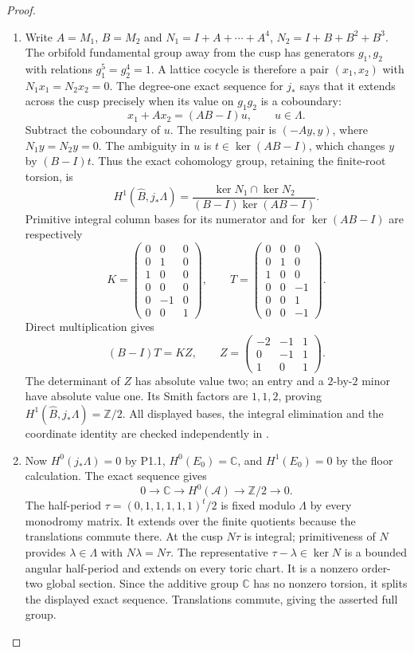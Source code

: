 \begin{proof}
\begin{enumerate}[label=\arabic*.]
\item Write $A=M_1$, $B=M_2$ and
$N_1=I+A+\cdots+A^4$, $N_2=I+B+B^2+B^3$.
The orbifold fundamental group away from the cusp has generators
$g_1,g_2$ with relations $g_1^5=g_2^4=1$.  A lattice cocycle is
therefore a pair $(x_1,x_2)$ with $N_1x_1=N_2x_2=0$.
The degree-one exact sequence for $j_*$ says that it extends across
the cusp precisely when its value on $g_1g_2$ is a coboundary:
\[
x_1+Ax_2=(AB-I)u,\qquad u\in\Lambda.
\]
Subtract the coboundary of $u$.  The resulting pair is $(-Ay,y)$,
where $N_1y=N_2y=0$.  The ambiguity in $u$ is
$t\in\ker(AB-I)$, which changes $y$ by $(B-I)t$.
Thus the exact cohomology group, retaining the finite-root torsion, is
\[
H^1(\widehat B,j_*\Lambda)=
\frac{\ker N_1\cap\ker N_2}{(B-I)\ker(AB-I)}.
\]
Primitive integral column bases for its numerator and for
$\ker(AB-I)$ are respectively
\[
K=\begin{pmatrix}
0&0&0\\0&1&0\\1&0&0\\0&0&0\\0&-1&0\\0&0&1
\end{pmatrix},\qquad
T=\begin{pmatrix}
0&0&0\\0&1&0\\1&0&0\\0&0&-1\\0&0&1\\0&0&-1
\end{pmatrix}.
\]
Direct multiplication gives
\[
(B-I)T=KZ,\qquad
Z=\begin{pmatrix}-2&-1&1\\0&-1&1\\1&0&1\end{pmatrix}.
\]
The determinant of $Z$ has absolute value two; an entry and a
$2$-by-$2$ minor have absolute value one.  Its Smith factors are
$1,1,2$, proving $H^1(\widehat B,j_*\Lambda)=\mathbb Z/2$.
All displayed bases, the integral elimination and the coordinate
identity are checked independently in
.

\item Now $H^0(j_*\Lambda)=0$ by P1.1,
$H^0(E_0)=\mathbb C$, and $H^1(E_0)=0$ by the floor
calculation. The exact sequence gives
\[
0\to\mathbb C\to H^0(\mathcal A)\to\mathbb Z/2\to0.
\]
The half-period
$\tau=(0,1,1,1,1,1)^t/2$ is fixed modulo $\Lambda$
by every monodromy matrix. It extends over the finite
quotients because the translations commute there.
At the cusp $N\tau$ is integral; primitiveness of $N$
provides $\lambda\in\Lambda$ with $N\lambda=N\tau$.
The representative $\tau-\lambda\in\ker N$ is a bounded
angular half-period and extends on every toric chart.
It is a nonzero order-two global section. Since the
additive group $\mathbb C$ has no nonzero torsion, it
splits the displayed exact sequence. Translations
commute, giving the asserted full group.


\end{enumerate}
\end{proof}
